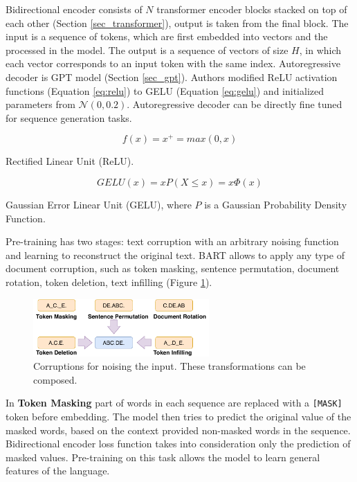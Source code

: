 Bidirectional encoder consists of $N$ transformer encoder blocks stacked on top of each other (Section \ref{sec_transformer}), output is taken from the final block. The input is a sequence of tokens, which are first embedded into vectors and the processed in the model. The output is a sequence of vectors of size $H$, in which each vector corresponds to an input token with the same index. Autoregressive decoder is GPT model (Section \ref{sec_gpt}). Authors modified ReLU activation functions (Equation \ref{eq:relu}) to GELU (Equation \ref{eq:gelu}) and initialized parameters from $\mathcal{N}(0, 0.2)$. Autoregressive decoder can be directly fine tuned for sequence generation tasks.

\begin{eqfloat} [H]
\begin{equation} \label{eq:relu}
f(x) = x^+ = max(0, x)
\end{equation}
\caption{Rectified Linear Unit (ReLU).}
\end{eqfloat}
\begin{eqfloat} [H]
\begin{equation} \label{eq:gelu}
GELU(x) = xP(X \leq x) = x \Phi(x)
\end{equation}
\caption{Gaussian Error Linear Unit (GELU), where $P$ is a Gaussian Probability Density Function.}
\end{eqfloat}

Pre-training has two stages: text corruption with an arbitrary noising function and learning to reconstruct the original text. BART allows to apply any type of document corruption, such as token masking, sentence permutation, document rotation, token deletion, text infilling (Figure \ref{fig:bart_doc_corruption}).

\begin{figure}[hbt]
  \centering
  \includegraphics[width=0.6\textwidth]{figures/bart_doc_corruptions.pdf}
  \caption{Corruptions for noising the input. These transformations can be composed.}
  \label{fig:bart_doc_corruption}
\end{figure}

In \textbf{Token Masking} part of words in each sequence are replaced with a \texttt{[MASK]} token before embedding. The model then tries to predict the original value of the masked words, based on the context provided non-masked words in the sequence. Bidirectional encoder loss function takes into consideration only the prediction of masked values. Pre-training on this task allows the model to learn general features of the language.

